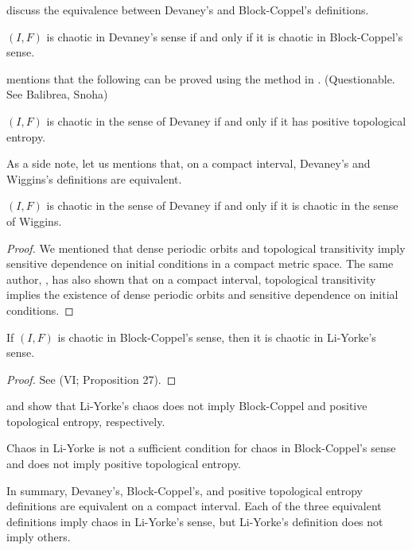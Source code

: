 \documentclass[12pt,twoside,draft]{book}
\begin{document}
\citet{aulbach} discuss the equivalence between Devaney's and Block-Coppel's definitions.
\begin{theorem}
  \citep{aulbach}
  $(I,F)$ is chaotic in Devaney's sense if and only if it is chaotic in Block-Coppel's sense.
  \label{devaney-blockcoppel}
\end{theorem}

\citet{forti} mentions that the following can be proved using the method in \citet{omegachaos}. (Questionable. See Balibrea, Snoha)
\begin{theorem}
  $(I,F)$ is chaotic in the sense of Devaney if and only if it has positive topological entropy.
  \label{thm:devaney-entropy}
\end{theorem}

As a side note, let us mentions that, on a compact interval, Devaney's and Wiggins's definitions are equivalent.
\begin{theorem}
   $(I,F)$ is chaotic in the sense of Devaney if and only if it is chaotic in the sense of Wiggins.
  \label{thm:devaney-wiggins}
  \begin{proof}
    We mentioned that dense periodic orbits and topological transitivity imply sensitive dependence on initial conditions in a compact metric space.
    The same author, \citet{silverman}, has also shown that on a compact interval, topological transitivity implies the existence of dense periodic orbits and sensitive dependence on initial conditions.
  \end{proof}
\end{theorem}

\begin{theorem}
  \citep{blockcoppel}
  If $(I,F)$ is chaotic in Block-Coppel's sense, then it is chaotic in Li-Yorke's sense.
  \label{thm:devaney-liyorke}
  \begin{proof}
    See \citet{blockcoppel} (VI; Proposition 27).
  \end{proof}
\end{theorem}

\citet{aulbach} and \citet{smital} show that Li-Yorke's chaos does not imply Block-Coppel and positive topological entropy, respectively.
\begin{theorem}
  \citep{aulbach, smital}
  Chaos in Li-Yorke is not a sufficient condition for chaos in Block-Coppel's sense and does not imply positive topological entropy.
  \label{thm:counterexample1}
\end{theorem}

In summary, Devaney's, Block-Coppel's, and positive topological entropy definitions are equivalent on a compact interval.
Each of the three equivalent definitions imply chaos in Li-Yorke's sense, but Li-Yorke's definition does not imply others.
\end{document}

